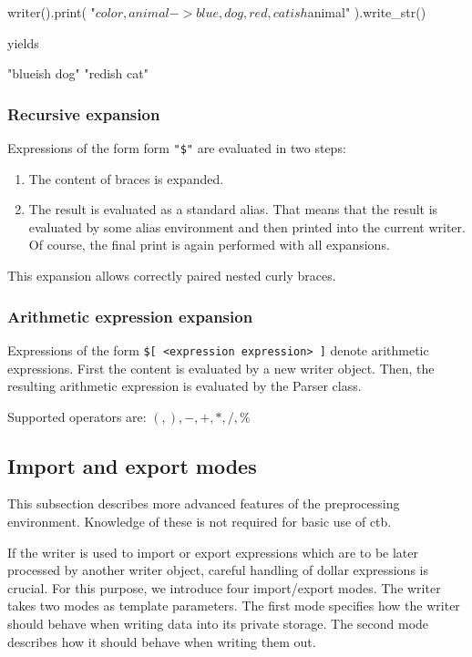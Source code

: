\mybeginfig
\begin{code}
writer().print(
  "${ color,animal ->blue,dog,red,cat}ish $animal"
).write_str()
\end{code}
yields
\begin{code}
"blueish dog\n"
"redish cat\n"
\end{code}


\subsubsection{Recursive expansion}
Expressions of the form form \texttt{"\$"} are evaluated in two steps:
\begin{enumerate}
  \item The content of braces is expanded.
  \item The result is evaluated as a standard alias. That means that the result is evaluated by some alias environment and then printed into the current writer. Of course, the final print is again performed with all expansions.
\end{enumerate}

This expansion allows correctly paired nested curly braces.

\subsubsection{Arithmetic expression expansion}

Expressions of the form \texttt{\$[ <expression expression> ]} denote arithmetic expressions. First the content is evaluated by a new writer object. Then, the resulting arithmetic expression is evaluated by the Parser class.

Supported operators are: $(, ), -, +, *, /, \%$


\subsection*{Import and export modes}

\begin{rem}
  This subsection describes more advanced features of the preprocessing environment. Knowledge of these is not required for basic use of ctb.
\end{rem}

If the writer is used to import or export expressions which are to be later processed by another writer object, careful handling of dollar expressions is crucial. For this purpose, we introduce four import/export modes. The writer takes two modes as template parameters. The first mode specifies how the writer should behave when writing data into its private storage. The second mode describes how it should behave when writing them out.

